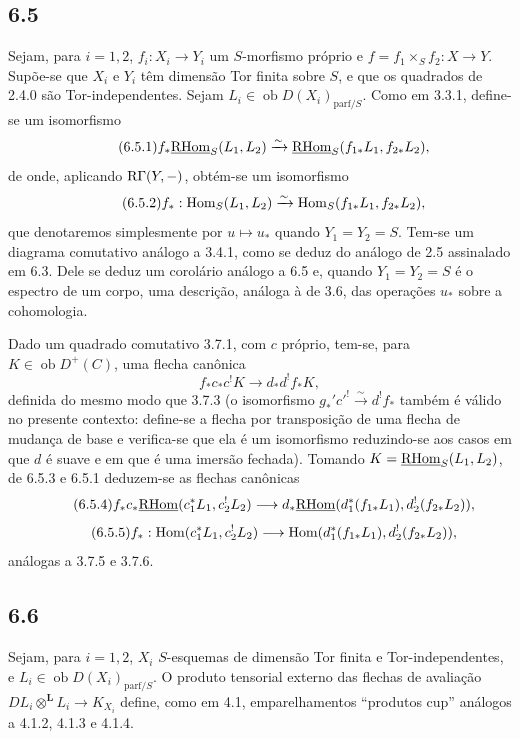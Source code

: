 \subsection*{6.5}
Sejam, para $i=1,2$, $f_i:X_i\to Y_i$ um $S$-morfismo próprio e $f=f_1\times_Sf_2:X\to Y$. Supõe-se que $X_i$ e $Y_i$ têm dimensão Tor finita sobre $S$, e que os quadrados de 2.4.0 são Tor-independentes. Sejam $L_i\in\operatorname{ob}D(X_i)_{\mathrm{parf}/S}$. Como em 3.3.1, define-se um isomorfismo
\begin{equation}
\tag{6.5.1}
f_*\underline{\mathrm{RHom}}_S(L_1,L_2)\xrightarrow{\sim}\underline{\mathrm{RHom}}_S(f_{1*}L_1,f_{2*}L_2),
\end{equation}
de onde, aplicando $\mathrm{R}\Gamma(Y,-)$, obtém-se um isomorfismo
\begin{equation}
\tag{6.5.2}
f_*:\operatorname{Hom}_S(L_1,L_2)\xrightarrow{\sim}\operatorname{Hom}_S(f_{1*}L_1,f_{2*}L_2),
\end{equation}
que denotaremos simplesmente por $u\mapsto u_*$ quando $Y_1=Y_2=S$. Tem-se um diagrama comutativo análogo a 3.4.1, como se deduz do análogo de 2.5 assinalado em 6.3. Dele se deduz um corolário análogo a 6.5 e, quando $Y_1=Y_2=S$ é o espectro de um corpo, uma descrição, análoga à de 3.6, das operações $u_*$ sobre a cohomologia.

Dado um quadrado comutativo 3.7.1, com $c$ próprio, tem-se, para $K\in\operatorname{ob}D^+(C)$, uma flecha canônica
\begin{equation}
\tag{6.5.3}
f_*c_*c^!K\longrightarrow d_*d^!f_*K,
\end{equation}
definida do mesmo modo que 3.7.3 (o isomorfismo $g_*'c'^!\xrightarrow{\sim}d^!f_*$ também é válido no presente contexto: define-se a flecha por transposição de uma flecha de mudança de base e verifica-se que ela é um isomorfismo reduzindo-se aos casos em que $d$ é suave e em que é uma imersão fechada). Tomando $K=\underline{\mathrm{RHom}}_S(L_1,L_2)$, de 6.5.3 e 6.5.1 deduzem-se as flechas canônicas
\begin{equation}
\tag{6.5.4}
f_*c_*\underline{\mathrm{RHom}}(c_1^*L_1,c_2^!L_2)\longrightarrow d_*\underline{\mathrm{RHom}}(d_1^*(f_{1*}L_1),d_2^!(f_{2*}L_2)),
\end{equation}
\begin{equation}
\tag{6.5.5}
f_*:\operatorname{Hom}(c_1^*L_1,c_2^!L_2)\longrightarrow\operatorname{Hom}(d_1^*(f_{1*}L_1),d_2^!(f_{2*}L_2)),
\end{equation}
análogas a 3.7.5 e 3.7.6.

\subsection*{6.6}
Sejam, para $i=1,2$, $X_i$ $S$-esquemas de dimensão Tor finita e Tor-independentes, e $L_i\in\operatorname{ob}D(X_i)_{\mathrm{parf}/S}$. O produto tensorial externo das flechas de avaliação $DL_i\otimes^{\mathbf L}L_i\to K_{X_i}$ define, como em 4.1, emparelhamentos ``produtos cup'' análogos a 4.1.2, 4.1.3 e 4.1.4.

